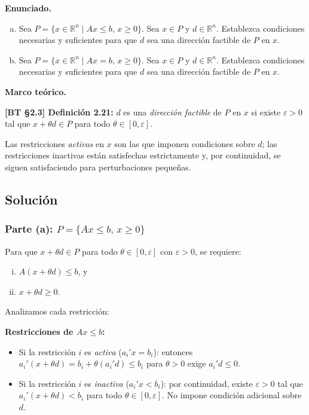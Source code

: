 \documentclass{article}
\newenvironment{marco}{\begin{mdframed}[linecolor=black!40,backgroundcolor=gray!5]\small\textbf{Marco teórico.}\par\smallskip}{\end{mdframed}\medskip}
\begin{document}
\textbf{Enunciado.}
\begin{enumerate}[a)]
  \item Sea $P = \{x \in \mathbb{R}^n \mid Ax \leq b,\, x \geq 0\}$. Sea $x \in P$ y $d \in \mathbb{R}^n$. Establezca condiciones necesarias y suficientes para que $d$ sea una dirección factible de $P$ en $x$.
  \item Sea $P = \{x \in \mathbb{R}^n \mid Ax = b,\, x \geq 0\}$. Sea $x \in P$ y $d \in \mathbb{R}^n$. Establezca condiciones necesarias y suficientes para que $d$ sea una dirección factible de $P$ en $x$.
\end{enumerate}

\begin{marco}
\textbf{[BT §2.3] Definición 2.21:} $d$ es una \emph{dirección factible} de $P$ en $x$ si existe $\varepsilon > 0$ tal que $x + \theta d \in P$ para todo $\theta \in [0, \varepsilon]$.

Las restricciones \emph{activas} en $x$ son las que imponen condiciones sobre $d$; las restricciones inactivas están satisfechas estrictamente y, por continuidad, se siguen satisfaciendo para perturbaciones pequeñas.
\end{marco}

\subsection*{Solución}

\subsubsection*{Parte (a): $P = \{Ax \leq b,\, x \geq 0\}$}

Para que $x + \theta d \in P$ para todo $\theta \in [0, \varepsilon]$ con $\varepsilon > 0$, se requiere:
\begin{enumerate}[(i)]
  \item $A(x + \theta d) \leq b$, y
  \item $x + \theta d \geq 0$.
\end{enumerate}

Analizamos cada restricción:

\textbf{Restricciones de $Ax \leq b$:}
\begin{itemize}
  \item Si la restricción $i$ es \emph{activa} ($a_i'x = b_i$): entonces $a_i'(x + \theta d) = b_i + \theta(a_i'd) \leq b_i$ para $\theta > 0$ exige $a_i'd \leq 0$.
  \item Si la restricción $i$ es \emph{inactiva} ($a_i'x < b_i$): por continuidad, existe $\varepsilon > 0$ tal que $a_i'(x+\theta d) < b_i$ para todo $\theta \in [0,\varepsilon]$. No impone condición adicional sobre $d$.
\end{itemize}
\end{document}
